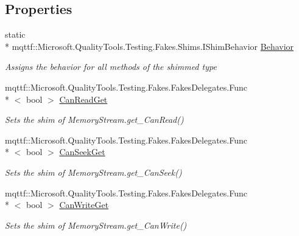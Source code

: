 \subsection*{Properties}
\begin{DoxyCompactItemize}
\item 
static \\*
mqttf\-::\-Microsoft.\-Quality\-Tools.\-Testing.\-Fakes.\-Shims.\-I\-Shim\-Behavior \hyperlink{class_system_1_1_i_o_1_1_fakes_1_1_shim_memory_stream_a6935b3ee5f45b8fc8c196ff7d23eb3d9}{Behavior}
\begin{DoxyCompactList}\small\item\em Assigns the behavior for all methods of the shimmed type\end{DoxyCompactList}\item 
mqttf\-::\-Microsoft.\-Quality\-Tools.\-Testing.\-Fakes.\-Fakes\-Delegates.\-Func\\*
$<$ bool $>$ \hyperlink{class_system_1_1_i_o_1_1_fakes_1_1_shim_memory_stream_a7cbb3dfd2900cb4a4ccb810343dfbfa4}{Can\-Read\-Get}
\begin{DoxyCompactList}\small\item\em Sets the shim of Memory\-Stream.\-get\-\_\-\-Can\-Read()\end{DoxyCompactList}\item 
mqttf\-::\-Microsoft.\-Quality\-Tools.\-Testing.\-Fakes.\-Fakes\-Delegates.\-Func\\*
$<$ bool $>$ \hyperlink{class_system_1_1_i_o_1_1_fakes_1_1_shim_memory_stream_a35d48510dfce7a8d0ca8cf7471b96802}{Can\-Seek\-Get}
\begin{DoxyCompactList}\small\item\em Sets the shim of Memory\-Stream.\-get\-\_\-\-Can\-Seek()\end{DoxyCompactList}\item 
mqttf\-::\-Microsoft.\-Quality\-Tools.\-Testing.\-Fakes.\-Fakes\-Delegates.\-Func\\*
$<$ bool $>$ \hyperlink{class_system_1_1_i_o_1_1_fakes_1_1_shim_memory_stream_a97816d7624a49885d4e825273c1d0656}{Can\-Write\-Get}
\begin{DoxyCompactList}\small\item\em Sets the shim of Memory\-Stream.\-get\-\_\-\-Can\-Write()\end{DoxyCompactList}\item 

\end{DoxyCompactItemize}

